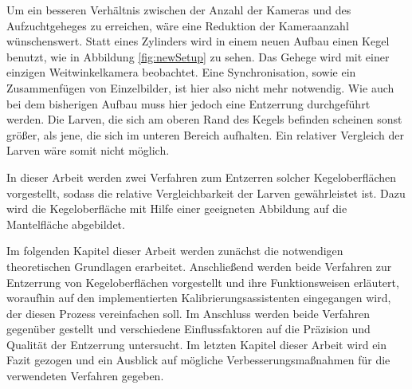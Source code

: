 Um ein besseren Verhältnis zwischen der Anzahl der Kameras und des Aufzuchtgeheges zu erreichen, wäre eine Reduktion der Kameraanzahl wünschenswert.
Statt eines Zylinders wird in einem neuen Aufbau einen Kegel benutzt, wie in Abbildung \ref{fig:newSetup} zu sehen. Das Gehege wird mit einer einzigen Weitwinkelkamera beobachtet. Eine Synchronisation, sowie ein Zusammenfügen von Einzelbilder, ist hier also nicht mehr notwendig.
Wie auch bei dem bisherigen Aufbau muss hier jedoch eine Entzerrung durchgeführt werden. Die Larven, die sich am oberen Rand des Kegels befinden scheinen sonst größer, als jene, die sich im unteren Bereich aufhalten. Ein relativer Vergleich der Larven wäre somit nicht möglich.

In dieser Arbeit werden zwei Verfahren zum Entzerren solcher Kegeloberflächen vorgestellt, sodass die relative Vergleichbarkeit der Larven gewährleistet ist.
Dazu wird die Kegeloberfläche mit Hilfe einer geeigneten Abbildung auf die Mantelfläche abgebildet.

Im folgenden Kapitel dieser Arbeit werden zunächst die notwendigen theoretischen Grundlagen erarbeitet.
Anschließend werden beide Verfahren zur Entzerrung von Kegeloberflächen vorgestellt und ihre Funktionsweisen erläutert, woraufhin auf den implementierten Kalibrierungsassistenten eingegangen wird, der diesen Prozess vereinfachen soll.
Im Anschluss werden beide Verfahren gegenüber gestellt und verschiedene Einflussfaktoren auf die Präzision und Qualität der Entzerrung untersucht.
Im letzten Kapitel dieser Arbeit wird ein Fazit gezogen und ein Ausblick auf mögliche Verbesserungsmaßnahmen für die verwendeten Verfahren gegeben.
